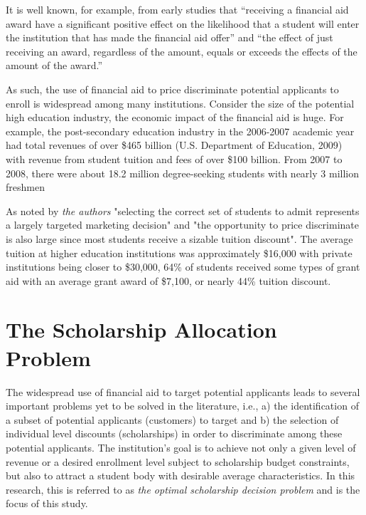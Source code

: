 \documentclass[12pt,english]{report}
\begin{document}
It is well known, for example, from early studies \citep{Heller1997,
Leslie1988} that ``receiving a financial aid award have a significant positive
effect on the likelihood that a student will enter the institution that has
made the financial aid offer'' and ``the effect of just receiving an award,
regardless of the amount, equals or exceeds the effects of the amount of the
award.''

As such, the use of financial aid to price discriminate potential applicants to
enroll is widespread among many institutions.   Consider the size of the
potential high education industry, the economic impact of the financial aid is
huge.    For example, the post-secondary education industry in the 2006-2007
academic year had total revenues of over \$465 billion (U.S. Department of
Education, 2009) with revenue from student tuition and fees of over \$100
billion.  From 2007 to 2008, there were about 18.2 million degree-seeking
students with nearly 3 million freshmen\citep{Belloni2012}

As noted by \textit{the authors}  "selecting the correct set of students to
admit represents a largely targeted marketing decision" and "the opportunity to
price discriminate is also large since most students receive a sizable tuition
discount".  The average tuition at higher education institutions was
approximately \$16,000 with private institutions being closer to \$30,000, 64\%
of students received some types of grant aid with an average grant award of
\$7,100, or nearly 44\% tuition discount.

\section{The Scholarship Allocation Problem}
The widespread use of financial aid to target potential applicants leads to
several important problems yet to be solved in the literature, i.e., a) the
identification of a subset of potential applicants (customers) to target and b)
the selection of individual level discounts (scholarships) in order to
discriminate among these potential applicants.  The institution's goal is to
achieve not only a given level of revenue  or a desired enrollment level
subject to scholarship budget constraints, but also to attract a student body
with desirable average characteristics. In this research, this is referred to
as \textit{the optimal scholarship decision problem} and is the focus of this
study.
\end{document}
